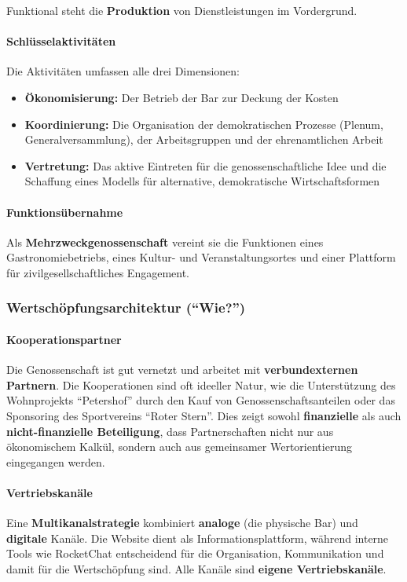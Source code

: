 Funktional steht die \textbf{Produktion} von Dienstleistungen im Vordergrund.

\paragraph{Schlüsselaktivitäten}
Die Aktivitäten umfassen alle drei Dimensionen:
\begin{itemize}
\item \textbf{Ökonomisierung:} Der Betrieb der Bar zur Deckung der Kosten
\item \textbf{Koordinierung:} Die Organisation der demokratischen Prozesse (Plenum, Generalversammlung), der Arbeitsgruppen und der ehrenamtlichen Arbeit
\item \textbf{Vertretung:} Das aktive Eintreten für die genossenschaftliche Idee und die Schaffung eines Modells für alternative, demokratische Wirtschaftsformen
\end{itemize}

\paragraph{Funktionsübernahme}
Als \textbf{Mehrzweckgenossenschaft} vereint sie die Funktionen eines Gastronomiebetriebs, eines Kultur- und Veranstaltungsortes und einer Plattform für zivilgesellschaftliches Engagement.

\subsubsection{Wertschöpfungsarchitektur (\enquote{Wie?})}

\paragraph{Kooperationspartner}
Die Genossenschaft ist gut vernetzt und arbeitet mit \textbf{verbundexternen Partnern}. Die Kooperationen sind oft ideeller Natur, wie die Unterstützung des Wohnprojekts \enquote{Petershof} durch den Kauf von Genossenschaftsanteilen oder das Sponsoring des Sportvereins \enquote{Roter Stern}. Dies zeigt sowohl \textbf{finanzielle} als auch \textbf{nicht-finanzielle Beteiligung}, dass Partnerschaften nicht nur aus ökonomischem Kalkül, sondern auch aus gemeinsamer Wertorientierung eingegangen werden.

\paragraph{Vertriebskanäle}
Eine \textbf{Multikanalstrategie} kombiniert \textbf{analoge} (die physische Bar) und \textbf{digitale} Kanäle. Die Website dient als Informationsplattform, während interne Tools wie RocketChat entscheidend für die Organisation, Kommunikation und damit für die Wertschöpfung sind. Alle Kanäle sind \textbf{eigene Vertriebskanäle}.

